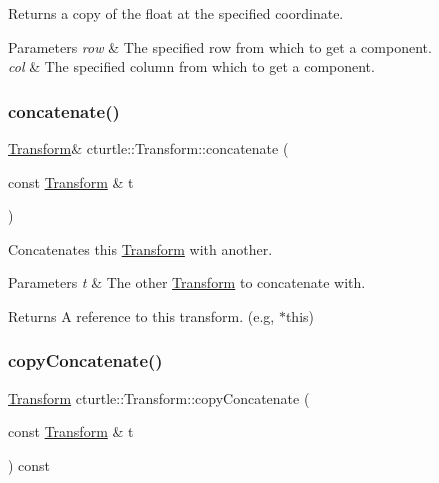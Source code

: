 Returns a copy of the float at the specified coordinate. 


\begin{DoxyParams}{Parameters}
{\em row} & The specified row from which to get a component. \\
\hline
{\em col} & The specified column from which to get a component. \\
\hline
\end{DoxyParams}
\mbox{\label{classcturtle_1_1Transform_add9d96d9ea677c39e2c6133e7f133aff}} 
\subsubsection{\texorpdfstring{concatenate()}{concatenate()}}
{\footnotesize\ttfamily \hyperlink{classcturtle_1_1Transform}{Transform}\& cturtle\+::\+Transform\+::concatenate (\begin{DoxyParamCaption}\item[{const \hyperlink{classcturtle_1_1Transform}{Transform} \&}]{t }\end{DoxyParamCaption})\hspace{0.3cm}{\ttfamily [inline]}}



Concatenates this \hyperlink{classcturtle_1_1Transform}{Transform} with another. 


\begin{DoxyParams}{Parameters}
{\em t} & The other \hyperlink{classcturtle_1_1Transform}{Transform} to concatenate with. \\
\hline
\end{DoxyParams}
\begin{DoxyReturn}{Returns}
A reference to this transform. (e.\+g, $\ast$this) 
\end{DoxyReturn}
\mbox{\label{classcturtle_1_1Transform_a52442d40b46368002c318f2167ff3db4}} 
\subsubsection{\texorpdfstring{copy\+Concatenate()}{copyConcatenate()}}
{\footnotesize\ttfamily \hyperlink{classcturtle_1_1Transform}{Transform} cturtle\+::\+Transform\+::copy\+Concatenate (\begin{DoxyParamCaption}\item[{const \hyperlink{classcturtle_1_1Transform}{Transform} \&}]{t }\end{DoxyParamCaption}) const\hspace{0.3cm}{\ttfamily [inline]}}



